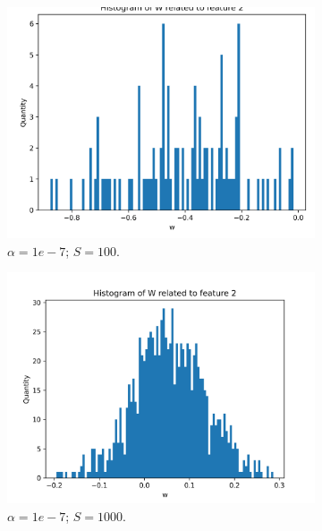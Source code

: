 \documentclass{article}
\begin{document}
\begin{figure}
  \centering
  \begin{subfigure}[t]{0.24\textwidth}
    \centering
    \includegraphics[width=\linewidth]{hist_feat1_1_sample_100.png}
    \caption{$\alpha = 1e-7$; $S = 100$.}
  \end{subfigure}
  \hfill
  \begin{subfigure}[t]{0.24\textwidth}
    \centering
    \includegraphics[width=\linewidth]{hist_feat1_1_sample_1000.png}
    \caption{$\alpha = 1e-7$; $S = 1000$.}
  \end{subfigure}
  \hfill
  \begin{subfigure}[t]{0.24\textwidth}
    \centering

\end{subfigure}
\end{figure}
\end{document}
